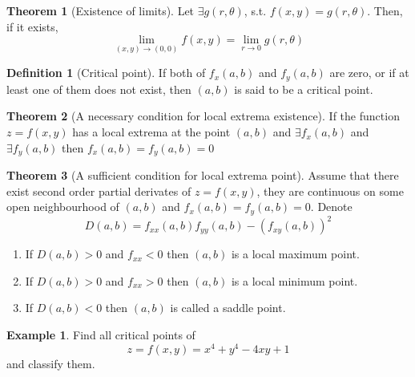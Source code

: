 \documentclass[fleqn, a4paper, 10pt]{article}
\theoremstyle{definition}
\newtheorem{example}{Example}
\newtheorem{definition}{Definition}
\theoremstyle{theorem}
\newtheorem{theorem}{Theorem}
\theoremstyle{remark}
\begin{document}
\begin{multicols}{2}
\begin{theorem}[Existence of limits]
	Let $\exists g(r,\theta)$, s.t. $f(x,y) = g(r, \theta)$. Then, if it exists, 
	\begin{equation*}
		\lim\limits_{(x,y) \to (0,0)} f(x,y) = \lim\limits_{r \to 0} g(r, \theta)
	\end{equation*}
\end{theorem}

\begin{definition}[Critical point]
	If both of $f_x(a,b)$ and $f_y(a,b)$ are zero, or if at least one of them does not exist, then $(a,b)$ is said to be a critical point.
\end{definition}

\begin{theorem}[A necessary condition for local extrema existence]
	If the function $z = f(x, y)$ has a local extrema at the point $(a, b)$ and $\exists f_x (a, b)$ and $\exists f_y (a, b)$ then $f_x (a, b) = f_y (a, b) = 0$
\end{theorem}

\begin{theorem}[A sufficient condition for local extrema point]
	Assume that there exist second order partial derivates of $z = f(x,y)$, they are continuous on some open neighbourhood of $(a,b)$ and $f_x(a,b) =f_y(a,b) = 0$. Denote 
	\begin{equation*}
	D(a, b) = f_{xx}(a,b) f_{yy}(a,b) - \left( f_{xy}(a,b) \right)^2
	\end{equation*}
	\begin{enumerate}
		\item If $D(a,b) > 0$ and $f_{xx} < 0$ then $(a,b)$ is a local maximum point.
		\item If $D(a,b) > 0$ and $f_{xx} > 0$ then $(a,b)$ is a local minimum point.
		\item If $D(a,b) < 0$ then $(a,b)$ is called a saddle point.
	\end{enumerate}
\end{theorem}

\begin{example}
	Find all critical points of 
	\begin{equation*}
	z = f(x,y) = x^4 + y^4 - 4xy + 1
	\end{equation*}
	and classify them.
\end{example}


\end{multicols}
\end{document}
